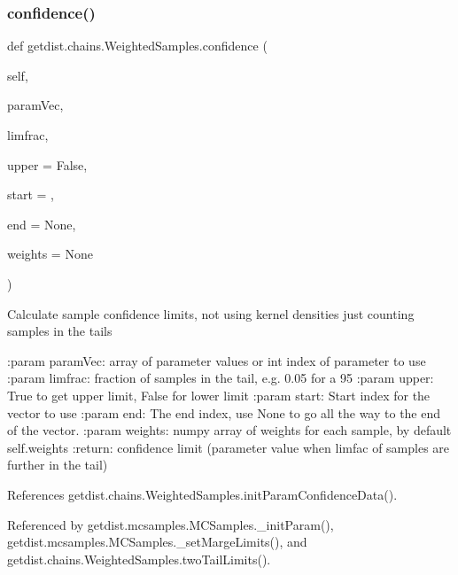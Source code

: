 \subsubsection{\texorpdfstring{confidence()}{confidence()}}
{\footnotesize\ttfamily def getdist.\+chains.\+Weighted\+Samples.\+confidence (\begin{DoxyParamCaption}\item[{}]{self,  }\item[{}]{param\+Vec,  }\item[{}]{limfrac,  }\item[{}]{upper = {\ttfamily False},  }\item[{}]{start = {},  }\item[{}]{end = {\ttfamily None},  }\item[{}]{weights = {\ttfamily None} }\end{DoxyParamCaption})}

\begin{DoxyVerb}Calculate sample confidence limits, not using kernel densities just counting samples in the tails

:param paramVec: array of parameter values or int index of parameter to use
:param limfrac: fraction of samples in the tail, e.g. 0.05 for a 95%
:param upper: True to get upper limit, False for lower limit
:param start: Start index for the vector to use
:param end: The end index, use None to go all the way to the end of the vector.
:param weights:  numpy array of weights for each sample, by default self.weights
:return: confidence limit (parameter value when limfac of samples are further in the tail)
\end{DoxyVerb}
 

References getdist.\+chains.\+Weighted\+Samples.\+init\+Param\+Confidence\+Data().



Referenced by getdist.\+mcsamples.\+M\+C\+Samples.\+\_\+init\+Param(), getdist.\+mcsamples.\+M\+C\+Samples.\+\_\+set\+Marge\+Limits(), and getdist.\+chains.\+Weighted\+Samples.\+two\+Tail\+Limits().

